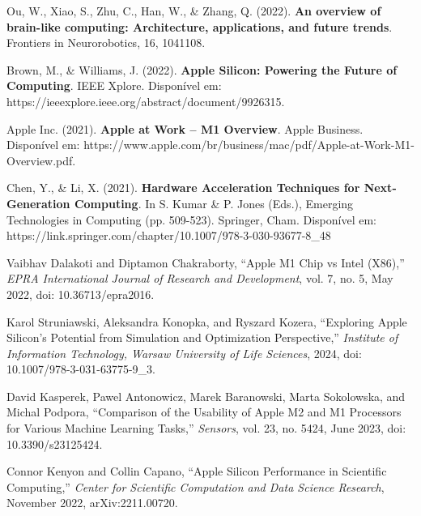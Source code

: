 \documentclass[a4paper,times,12pt]{article}
\begin{document}
\newpage
\begin{thebibliography}{00}
 Ou, W., Xiao, S., Zhu, C., Han, W., \& Zhang, Q. (2022). \textbf{An overview of brain-like computing: Architecture, applications, and future trends}. Frontiers in Neurorobotics, 16, 1041108.

 Brown, M., \& Williams, J. (2022). \textbf{Apple Silicon: Powering the Future of Computing}. IEEE Xplore. Disponível em: https://ieeexplore.ieee.org/abstract/document/9926315.

 Apple Inc. (2021). \textbf{Apple at Work – M1 Overview}. Apple Business. Disponível em: https://www.apple.com/br/business/mac/pdf/Apple-at-Work-M1-Overview.pdf.

 Chen, Y., \& Li, X. (2021). \textbf{Hardware Acceleration Techniques for Next-Generation Computing}. In S. Kumar \& P. Jones (Eds.), Emerging Technologies in Computing (pp. 509-523). Springer, Cham. Disponível em: https://link.springer.com/chapter/10.1007/978-3-030-93677-8\_48

Vaibhav Dalakoti and Diptamon Chakraborty, ``Apple M1 Chip vs Intel (X86),'' \textit{EPRA International Journal of Research and Development}, vol. 7, no. 5, May 2022, doi: 10.36713/epra2016.

Karol Struniawski, Aleksandra Konopka, and Ryszard Kozera, ``Exploring Apple Silicon's Potential from Simulation and Optimization Perspective,'' \textit{Institute of Information Technology, Warsaw University of Life Sciences}, 2024, doi: 10.1007/978-3-031-63775-9\_3.

David Kasperek, Pawel Antonowicz, Marek Baranowski, Marta Sokolowska, and Michal Podpora, ``Comparison of the Usability of Apple M2 and M1 Processors for Various Machine Learning Tasks,'' \textit{Sensors}, vol. 23, no. 5424, June 2023, doi: 10.3390/s23125424.

Connor Kenyon and Collin Capano, ``Apple Silicon Performance in Scientific Computing,'' \textit{Center for Scientific Computation and Data Science Research}, November 2022, arXiv:2211.00720.
\end{thebibliography}
\end{document}
